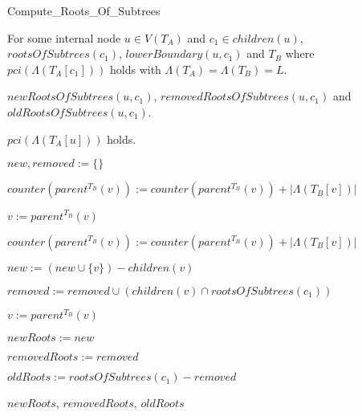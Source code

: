 \documentclass{article}
\newcommand{\leafset}{\Lambda}
\begin{document}
    \begin{algorithm}
        \caption{Compute\_Roots\_Of\_Subtrees}
        \label{alg:computerootsofsubtrees}

        \begin{algorithmic}[1]
            \Input For some internal node $u \in V(T_A)$ and $c_1 \in children(u)$, $rootsOfSubtrees(c_1)$, $lowerBoundary(u, c_1)$ and $T_B$ where $pci(\leafset(T_A[c_1]))$ holds with $\leafset(T_A) = \leafset(T_B) = L$.

            \Output $newRootsOfSubtrees(u, c_1)$, $removedRootsOfSubtrees(u, c_1)$ and $oldRootsOfSubtrees(u, c_1)$.

            \SideEffect $pci(\leafset(T_A[u]))$ holds.

            \State $new, removed := \{\}$

                \State $counter(parent^{T_B}(v)) := counter(parent^{T_B}(v)) + |\leafset(T_B[v])|$

                \State $v := parent^{T_B}(v)$

                \While{$counter(v) = |\leafset(T_B[v])|$}
                    \State $counter(parent^{T_B}(v)) := counter(parent^{T_B}(v)) + |\leafset(T_B[v])|$

                    \State $new := (new \cup \{v\}) - children(v)$

                    \State $removed := removed \cup (children(v) \cap rootsOfSubtrees(c_1))$

                    \State $v := parent^{T_B}(v)$
                \EndWhile
            \EndFor

            \State $newRoots := new$

            \State $removedRoots := removed$

            \State $oldRoots := rootsOfSubtrees(c_1) - removed$

            \State \Return $newRoots$, $removedRoots$, $oldRoots$
        \end{algorithmic}
    \end{algorithm}
\end{document}
